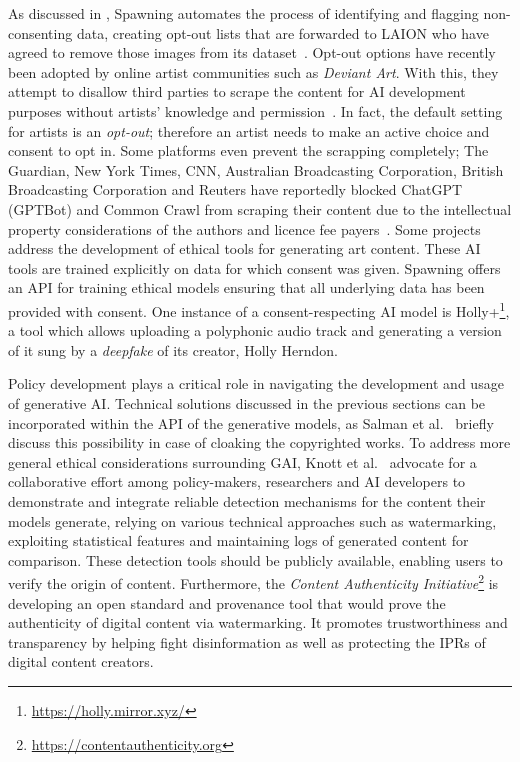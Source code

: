 \documentclass[conference,table]{IEEEtran}
\begin{document}
As discussed in , Spawning automates the process of identifying and flagging non-consenting data, creating opt-out lists that are forwarded to LAION who have agreed to remove those images from its dataset~\cite{wu_how_2023}.
Opt-out options have recently been adopted by online artist communities such as \textit{Deviant Art}. 
With this, they attempt to disallow third parties to scrape the content for AI development purposes without artists' knowledge and permission~\cite{wiggers_deviantart_2022}. 
In fact, the default setting for artists is an \textit{opt-out}; therefore an artist needs to make an active choice and consent to opt in. 
Some platforms even prevent the scrapping completely; The Guardian, New York Times, CNN, Australian Broadcasting Corporation, British Broadcasting Corporation and Reuters have reportedly blocked ChatGPT (GPTBot) and Common Crawl from scraping their content due to the intellectual property considerations of the authors and licence fee payers~\cite{bogle_new_2023,marcus_generative_2024}.
Some projects address the development of ethical tools for generating art content. 
These AI tools are trained explicitly on data for which consent was given.
Spawning offers an API for training ethical models ensuring that all underlying data has been provided with consent.
One instance of a consent-respecting AI model is Holly+\footnote{\href{https://holly.mirror.xyz/54ds2IiOnvthjGFkokFCoaI4EabytH9xjAYy1irHy94}{https://holly.mirror.xyz/}}, a tool which allows uploading a polyphonic audio track and generating a version of it sung by a \textit{deepfake} of its creator, Holly Herndon.

Policy development plays a critical role in navigating the development and usage of generative AI. 
Technical solutions discussed in the previous sections can be incorporated within the API of the generative models, as Salman et al.~\cite{salman_raising_2023} briefly discuss this possibility in case of cloaking the copyrighted works. 
To address more general ethical considerations surrounding GAI, Knott et al.~\cite{knott_generative_2023} advocate for a collaborative effort among policy-makers, researchers and AI developers to demonstrate and integrate reliable detection mechanisms for the content their models generate, relying on various technical approaches such as watermarking, exploiting statistical features and maintaining logs of generated content for comparison. These detection tools should be publicly available, enabling users to verify the origin of content. 
Furthermore, the \textit{Content Authenticity Initiative}\footnote{\url{https://contentauthenticity.org}} is developing an open standard and provenance tool that would prove the authenticity of digital content via watermarking. 
It promotes trustworthiness and transparency by helping fight disinformation as well as protecting the IPRs of digital content creators.
\end{document}
